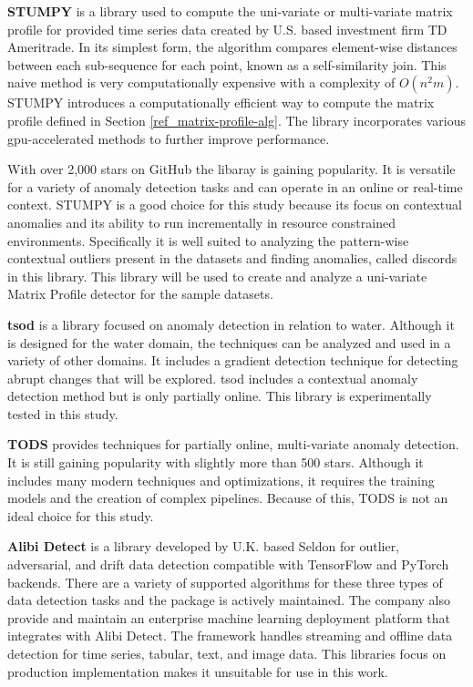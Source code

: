 \textbf{STUMPY} \parencite{law2019stumpy} is a library used to compute the uni-variate or multi-variate matrix profile for provided time series data created by U.S. based investment firm TD Ameritrade. In its simplest form, the algorithm compares element-wise distances between each sub-sequence for each point, known as a self-similarity join. This naive method is very computationally expensive with a complexity of $O(n^2m)$. STUMPY introduces a computationally efficient way to compute the matrix profile defined in Section \ref{ref_matrix-profile-alg}. The library incorporates various gpu-accelerated methods to further improve performance.

With over 2,000 stars on GitHub the libaray is gaining popularity. It is versatile for a variety of anomaly detection tasks and can operate in an online or real-time context. STUMPY is a good choice for this study because its focus on contextual anomalies and its ability to run incrementally in resource constrained environments. Specifically it is well suited to analyzing the pattern-wise contextual outliers present in the datasets and finding anomalies, called discords in this library. This library will be used to create and analyze a uni-variate Matrix Profile detector for the sample datasets. 

\textbf{tsod} \parencite{tsod} is a library focused on anomaly detection in relation to water. Although it is designed for the water domain, the techniques can be analyzed and used in a variety of other domains. It includes a gradient detection technique for detecting abrupt changes that will be explored. tsod includes a contextual anomaly detection method but is only partially online. This library is experimentally tested in this study.

\textbf{TODS} \parencite{Lai_2021_TODS} provides techniques for partially online, multi-variate anomaly detection. It is still gaining popularity with slightly more than 500 stars. Although it includes many modern techniques and optimizations, it requires the training models and the creation of complex pipelines. Because of this, TODS is not an ideal choice for this study.

\textbf{Alibi Detect} \parencite{alibi-detect} is a library developed by U.K. based Seldon for outlier, adversarial, and drift data detection compatible with TensorFlow and PyTorch backends. There are a variety of supported algorithms for these three types of data detection tasks and the package is actively maintained. The company also provide and maintain an enterprise machine learning deployment platform that integrates with Alibi Detect. The framework handles streaming and offline data detection for time series, tabular, text, and image data. This libraries focus on production implementation makes it unsuitable for use in this work.

